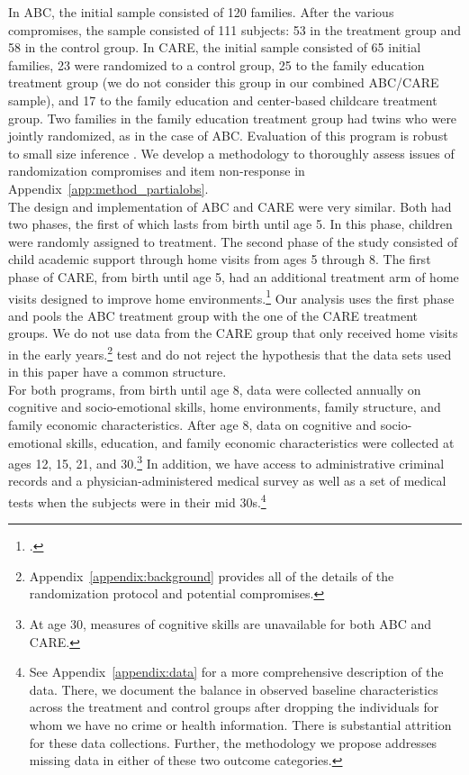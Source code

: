 \noindent In ABC, the initial sample consisted of 120 families. After the various compromises, the sample consisted of 111 subjects: 53 in the treatment group and 58 in the control group. In CARE, the initial sample consisted of 65 initial families, 23 were randomized to a control group, 25 to the family education treatment group (we do not consider this group in our combined ABC/CARE sample), and 17 to the family education and center-based childcare treatment group. Two families in the family education treatment group had twins who were jointly randomized, as in the case of ABC. Evaluation of this program is robust to small size inference \citep{Campbell_Conti_etal_2014_EarlyChildhoodInvestments}. We  develop a methodology to thoroughly assess issues of randomization compromises and item non-response in Appendix~\ref{app:method_partialobs}.\\

\noindent The design and implementation of ABC and CARE were very similar. Both had two phases, the first of which lasts from birth until age 5. In this phase, children were randomly assigned to treatment. The second phase of the study consisted of child academic support through home visits from ages 5 through 8. The first phase of CARE, from birth until age 5, had an additional treatment arm of home visits designed to improve home environments.\footnote{\citet{Wasik_Ramey_etal_1990_CD}.} Our analysis uses the first phase and pools the ABC treatment group with the one of the CARE treatment groups. We do not use data from the CARE group that only received home visits in the early years.\footnote{Appendix~\ref{appendix:background} provides all of the details of the randomization protocol and potential compromises.} \cite{Campbell_Conti_etal_2014_EarlyChildhoodInvestments} test and do not reject the hypothesis that the data sets used in this paper have a common structure.\\

\noindent For both programs, from birth until age 8, data were collected annually on cognitive and socio-emotional skills, home environments, family structure, and family economic characteristics. After age 8, data on cognitive and socio-emotional skills, education, and family economic characteristics were collected at ages 12, 15, 21, and 30.\footnote{At age 30, measures of cognitive skills are unavailable for both ABC and CARE.} In addition, we have access to administrative criminal records and a physician-administered medical survey as well as a set of medical tests when the subjects were in their mid 30s.\footnote{See  Appendix~\ref{appendix:data} for a more comprehensive description of the data. There, we document the balance in observed baseline characteristics across the treatment and control groups after dropping the individuals for whom we have no crime or health information. There is substantial attrition for these data collections. Further, the methodology we propose addresses missing data in either of these two outcome categories.}\\

